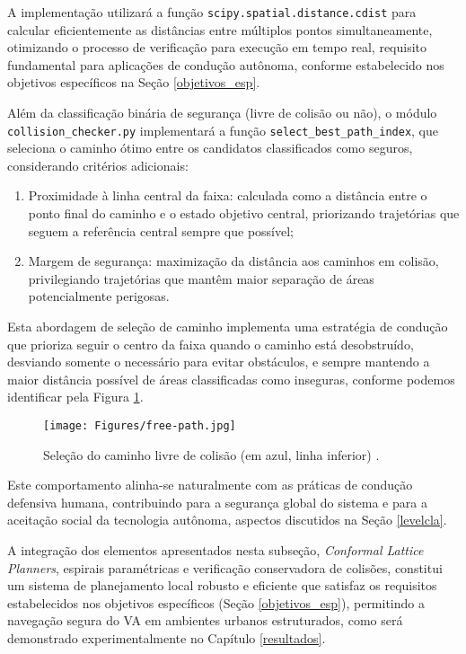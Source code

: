 A implementação utilizará a função \texttt{scipy.spatial.distance.cdist} para calcular eficientemente as distâncias entre múltiplos pontos simultaneamente, otimizando o processo de verificação para execução em tempo real, requisito fundamental para aplicações de condução autônoma, conforme estabelecido nos objetivos específicos na Seção \ref{objetivos_esp}.

Além da classificação binária de segurança (livre de colisão ou não), o módulo \texttt{collision\_checker.py} implementará a função \texttt{select\_best\_path\_index}, que seleciona o caminho ótimo entre os candidatos classificados como seguros, considerando critérios adicionais:

\begin{enumerate}
    \item Proximidade à linha central da faixa: calculada como a distância entre o ponto final do caminho e o estado objetivo central, priorizando trajetórias que seguem a referência central sempre que possível;
    \item Margem de segurança: maximização da distância aos caminhos em colisão, privilegiando trajetórias que mantêm maior separação de áreas potencialmente perigosas.
\end{enumerate}

Esta abordagem de seleção de caminho implementa uma estratégia de condução que prioriza seguir o centro da faixa quando o caminho está desobstruído, desviando somente o necessário para evitar obstáculos, e sempre mantendo a maior distância possível de áreas classificadas como inseguras, conforme podemos identificar pela Figura \ref{free-path}.

\begin{figure}[H]
\centering
\texttt{[image: Figures/free-path.jpg]}
\caption{Seleção do caminho livre de colisão (em azul, linha inferior) \cite[Module 8 - Lesson 4: Conformal Lattice Planning. ~9min]{University_of_Toronto2018-mp}.}
\label{free-path}
\end{figure}

Este comportamento alinha-se naturalmente com as práticas de condução defensiva humana, contribuindo para a segurança global do sistema e para a aceitação social da tecnologia autônoma, aspectos discutidos na Seção \ref{levelcla}.

A integração dos elementos apresentados nesta subseção, \textit{Conformal Lattice Planners}, espirais paramétricas e verificação conservadora de colisões, constitui um sistema de planejamento local robusto e eficiente que satisfaz os requisitos estabelecidos nos objetivos específicos (Seção \ref{objetivos_esp}), permitindo a navegação segura do VA em ambientes urbanos estruturados, como será demonstrado experimentalmente no Capítulo \ref{resultados}.

